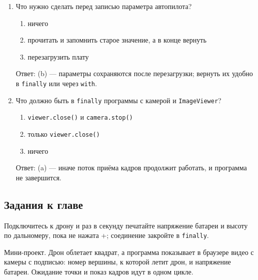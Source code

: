 \begin{enumerate}
    Ответ: (b) --- обработчик работает в служебном потоке, который должен доставить событие посадки.
  \item Что нужно сделать перед записью параметра автопилота?
    \begin{enumerate}[label=(\alph*)] \item ничего \item прочитать и запомнить старое значение, а в конце вернуть \item перезагрузить плату \end{enumerate}
    Ответ: (b) --- параметры сохраняются после перезагрузки; вернуть их удобно в \verb|finally| или через \verb|with|.
  \item Что должно быть в \verb|finally| программы с камерой и \verb|ImageViewer|?
    \begin{enumerate}[label=(\alph*)] \item \verb|viewer.close()| и \verb|camera.stop()| \item только \verb|viewer.close()| \item ничего \end{enumerate}
    Ответ: (a) --- иначе поток приёма кадров продолжит работать, и программа не завершится.
\end{enumerate}

\subsection{Задания к главе}

\begin{taskbox}
Подключитесь к дрону и раз в секунду печатайте напряжение батареи и высоту по дальномеру, пока не нажата +; соединение закройте в \verb|finally|.
\end{taskbox}

\begin{taskbox}
Мини-проект. Дрон облетает квадрат, а программа показывает в браузере видео с камеры с подписью: номер вершины, к которой летит дрон, и напряжение батареи. Ожидание точки и показ кадров идут в одном цикле.
\end{taskbox}

